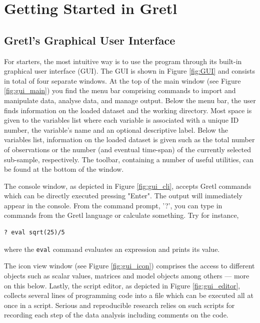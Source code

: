 \documentclass[11pt]{article}
\begin{document}


\section{Getting Started in Gretl}
\subsection{Gretl's Graphical User Interface}
For starters, the most intuitive way is to use the program through its built-in graphical user interface (GUI). The GUI is shown in Figure \ref{fig:GUI} and consists in total of four separate windows. At the top of the main window (see Figure \ref{fig:gui_main}) you find the menu bar comprising commands to import and manipulate data, analyse data, and manage output. Below the menu bar, the user finds information on the loaded dataset and the working directory. Most space is given to the variables list where each variable is associated with a unique ID number, the variable's name and an optional descriptive label. Below the variables list, information on the loaded dataset is given such as the total number of observations or the number (and eventual time-span) of the currently selected sub-sample, respectively. The toolbar, containing a number of useful utilities, can be found at the bottom of the window. 

The console window, as depicted in Figure \ref{fig:gui_cli}, accepts Gretl commands which can be directly executed pressing "Enter". The output will immediately appear in the console. From the command prompt, '?', you can type in commands from the Gretl language or calculate something. Try for instance,
\begin{verbatim}
? eval sqrt(25)/5
\end{verbatim}
where the \texttt{eval} command evaluates an expression and prints its value.

The icon view window (see Figure \ref{fig:gui_icon}) comprises the access to different objects such as scalar values, matrices and model objects among others --- more on this below. Lastly, the script editor, as depicted in Figure \ref{fig:gui_editor}, collects several lines of programming code into a file which can be executed all at once in a script. Serious and reproducible research relies on such scripts for recording each step of the data analysis including comments on the code.
\end{document}
